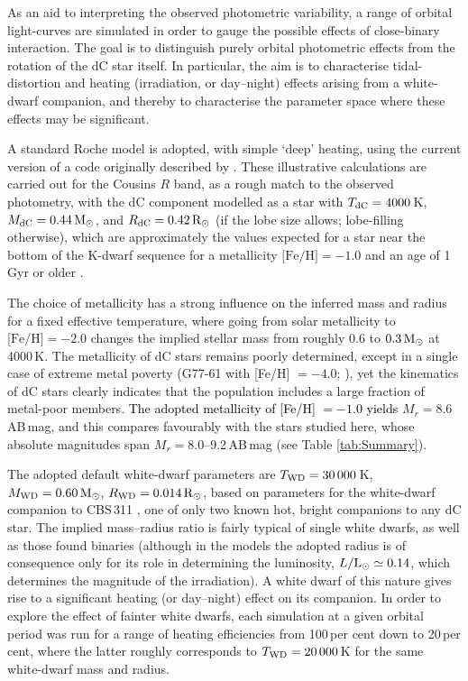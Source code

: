 \documentclass[fleqn,usenatbib,useAMS]{mnras}
\newcommand{\lw}[1]{\textcolor{black}{#1}}
\newcommand{\Rsun}{\ensuremath{\rm{R}_\odot}}
\newcommand{\Lsun}{\ensuremath{\rm{L}_\odot}}
\newcommand{\Msun}{\ensuremath{\rm{M}_\odot}}
\begin{document}
As an aid to interpreting the observed photometric variability, a range of orbital light-curves are simulated in order to gauge the possible effects of close-binary interaction.  The goal is to distinguish purely orbital photometric effects from the rotation of the dC star itself.  In particular, the aim is to characterise tidal-distortion and heating (irradiation, or day--night) effects arising from a white-dwarf companion, and thereby to characterise the parameter space where these effects may be significant.  

A standard Roche model is adopted, with simple `deep' heating, using the current version of a code originally described by \citet{Howarth82}.
These illustrative calculations are carried out for the Cousins $R$ band, as a rough match to the observed photometry, with the dC component modelled as a star with $T_{\rm dC}=4000$\,K, $M_{\rm dC}=0.44\,\Msun$, and $R_{\rm dC}=0.42\,\Rsun$ (if the lobe size allows; lobe-filling otherwise), which are approximately the values expected for a star near the bottom of the K-dwarf sequence for a metallicity $\text{[Fe/H]} = -1.0$ and an age of 1\,Gyr or older \citep{Dotter08}.  

The choice of metallicity has a strong influence on the inferred mass and radius for a fixed effective temperature, where going from solar metallicity to $\text{[Fe/H]} = -2.0$ changes the implied stellar mass from roughly 0.6 to $0.3\,\Msun$ at 4000\,K.  The metallicity of dC stars remains poorly determined, except in a single case of extreme metal poverty (G77-61 with [Fe/H] $= -4.0$; \citealt{Plez05}), yet the kinematics of dC stars clearly indicates that the population includes a large fraction of metal-poor members.  \lw{The adopted metallicity of [Fe/H] $=-1.0$ yields} $M_r =8.6$\,AB\,mag, and this compares favourably with the stars studied here, whose absolute magnitudes span $M_r =8.0$--9.2\,AB\,mag (see Table \ref{tab:Summary}).


 The adopted default white-dwarf parameters are $T_{\rm WD}=30\,000$\,K, $M_{\rm WD}=0.60\,\Msun$, $R_{\rm WD}=0.014\,\Rsun$, based on parameters for the white-dwarf companion to CBS\,311 \citep{Liebert1994}, one of only two known hot, bright companions to any dC star.
The implied mass--radius ratio is fairly typical of single white dwarfs, as well as those found binaries (although in the models the adopted radius is of consequence only for its role in determining the luminosity, $L/\Lsun \simeq 0.14$, which determines the magnitude of the irradiation).
A white dwarf of this nature gives rise to a significant heating (or day--night) effect on its companion.  In order to explore the effect of fainter white dwarfs, each simulation at a given orbital period was run for a range of heating efficiencies from 100\,per cent down to 20\,per cent, where the latter roughly corresponds to $T_{\rm WD}=20\,000$\,K for the same white-dwarf mass and radius.
\end{document}
